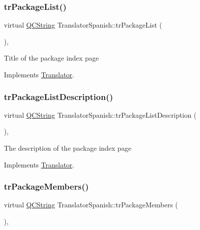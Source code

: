 \subsubsection{\texorpdfstring{trPackageList()}{trPackageList()}}
{\footnotesize\ttfamily virtual \mbox{\hyperlink{class_q_c_string}{Q\+C\+String}} Translator\+Spanish\+::tr\+Package\+List (\begin{DoxyParamCaption}{ }\end{DoxyParamCaption})\hspace{0.3cm}{\ttfamily [inline]}, {\ttfamily [virtual]}}

Title of the package index page 

Implements \mbox{\hyperlink{class_translator}{Translator}}.

\mbox{\label{class_translator_spanish_aa3befa0ee217e37fba362f8ea3e6e7e2}} 
\subsubsection{\texorpdfstring{trPackageListDescription()}{trPackageListDescription()}}
{\footnotesize\ttfamily virtual \mbox{\hyperlink{class_q_c_string}{Q\+C\+String}} Translator\+Spanish\+::tr\+Package\+List\+Description (\begin{DoxyParamCaption}{ }\end{DoxyParamCaption})\hspace{0.3cm}{\ttfamily [inline]}, {\ttfamily [virtual]}}

The description of the package index page 

Implements \mbox{\hyperlink{class_translator}{Translator}}.

\mbox{\label{class_translator_spanish_a90ad98a14d1499040a7d65fa11e2e930}} 
\subsubsection{\texorpdfstring{trPackageMembers()}{trPackageMembers()}}
{\footnotesize\ttfamily virtual \mbox{\hyperlink{class_q_c_string}{Q\+C\+String}} Translator\+Spanish\+::tr\+Package\+Members (\begin{DoxyParamCaption}{ }\end{DoxyParamCaption})\hspace{0.3cm}{\ttfamily [inline]}, {\ttfamily [virtual]}}

